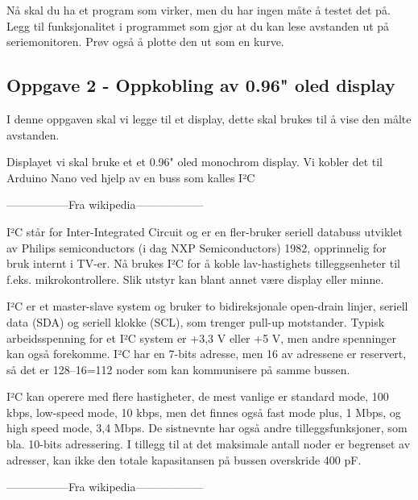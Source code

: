 Nå skal du ha et program som virker, men du har ingen måte å testet det på. Legg til funksjonalitet i programmet som gjør at du kan lese avstanden ut på seriemonitoren. Prøv også  å plotte den ut som en kurve. 

\subsection*{Oppgave 2 -  Oppkobling av 0.96" oled display}
I denne oppgaven skal vi legge til et display, dette skal brukes til å vise den målte avstanden. 


\vskip 5pt 
Displayet vi skal bruke et et 0.96" oled monochrom display. Vi kobler det til Arduino Nano ved hjelp av en buss som kalles I²C

\vskip 5pt 
-----------------Fra wikipedia------------------

\vskip 5pt 
I²C står for Inter-Integrated Circuit og er en fler-bruker seriell databuss utviklet av Philips semiconductors (i dag NXP Semiconductors) 1982, opprinnelig for bruk internt i TV-er. Nå brukes I²C for å koble lav-hastighets tilleggsenheter til f.eks. mikrokontrollere. Slik utstyr kan blant annet være display eller minne.

\vskip 5pt 
I²C er et master-slave system og bruker to bidireksjonale open-drain linjer, seriell data (SDA) og seriell klokke (SCL), som trenger pull-up motstander. Typisk arbeidsspenning for et I²C system er +3,3 V eller +5 V, men andre spenninger kan også forekomme. I²C har en 7-bits adresse, men 16 av adressene er reservert, så det er 128–16=112 noder som kan kommunisere på samme bussen.

\vskip 5pt 
I²C kan operere med flere hastigheter, de mest vanlige er standard mode, 100 kbps, low-speed mode, 10 kbps, men det finnes også fast mode plus, 1 Mbps, og high speed mode, 3,4 Mbps. De sistnevnte har også andre tilleggsfunksjoner, som bla. 10-bits adressering. I tillegg til at det maksimale antall noder er begrenset av adresser, kan ikke den totale kapasitansen på bussen overskride 400 pF.

\vskip 5pt 
-----------------Fra wikipedia------------------
\vskip 5pt

